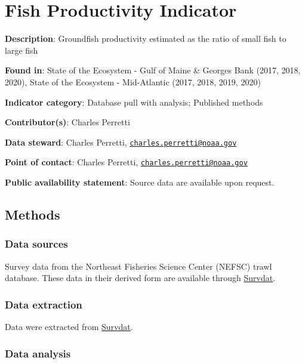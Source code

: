 \documentclass[
]{book}
\begin{document}
\hypertarget{fish-productivity-indicator}{%
\chapter{Fish Productivity Indicator}\label{fish-productivity-indicator}}

\textbf{Description}: Groundfish productivity estimated as the ratio of small fish to large fish

\textbf{Found in}: State of the Ecosystem - Gulf of Maine \& Georges Bank (2017, 2018, 2020), State of the Ecosystem - Mid-Atlantic (2017, 2018, 2019, 2020)

\textbf{Indicator category}: Database pull with analysis; Published methods

\textbf{Contributor(s)}: Charles Perretti

\textbf{Data steward}: Charles Perretti, \href{mailto:charles.perretti@noaa.gov}{\nolinkurl{charles.perretti@noaa.gov}}

\textbf{Point of contact}: Charles Perretti, \href{mailto:charles.perretti@noaa.gov}{\nolinkurl{charles.perretti@noaa.gov}}

\textbf{Public availability statement}: Source data are available upon request.

\hypertarget{methods-29}{%
\section{Methods}\label{methods-29}}

\hypertarget{data-sources-29}{%
\subsection{Data sources}\label{data-sources-29}}

Survey data from the Northeast Fisheries Science Center (NEFSC) trawl database. These data in their derived form are available through \protect\hyperlink{survdat}{Survdat}.

\hypertarget{data-extraction-25}{%
\subsection{Data extraction}\label{data-extraction-25}}

Data were extracted from \protect\hyperlink{survdat}{Survdat}.

\hypertarget{data-analysis-27}{%
\subsection{Data analysis}\label{data-analysis-27}}
\end{document}
